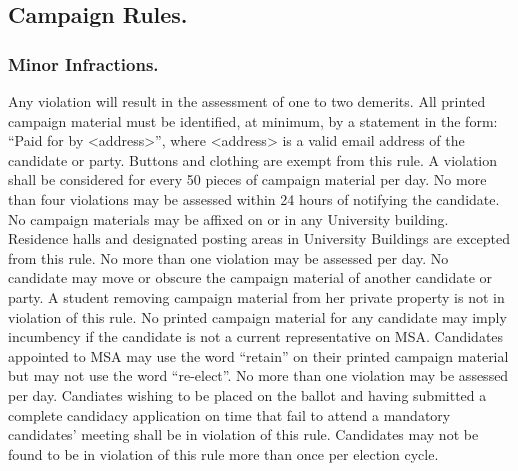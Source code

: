 \subsection{Campaign Rules.}

\subsubsection{Minor Infractions.}
Any violation will result in the assessment of one to two demerits.
All printed campaign material must be identified, at minimum, by a statement in the form: ``Paid for by <address>'', where <address> is a valid email address of the candidate or party.  Buttons and clothing are exempt from this rule.  A violation shall be considered for every 50 pieces of campaign material per day.  No more than four violations may be assessed within 24 hours of notifying the candidate.
No campaign materials may be affixed on or in any University building.  Residence halls and designated posting areas in University Buildings are excepted from this rule. No more than one violation may be assessed per day.
No candidate may move or obscure the campaign material of another candidate or party.  A student removing campaign material from her private property is not in violation of this rule.
No printed campaign material for any candidate may imply incumbency if the candidate is not a current representative on MSA.  Candidates appointed to MSA may use the word ``retain'' on their printed campaign material but may not use the word ``re-elect''.  No more than one violation may be assessed per day.
  Candiates  wishing to be placed on the ballot and having submitted a complete candidacy application on time that fail to attend a mandatory candidates' meeting shall be in violation of this rule. Candidates may not be found to be in violation of this rule more than once per election cycle.

